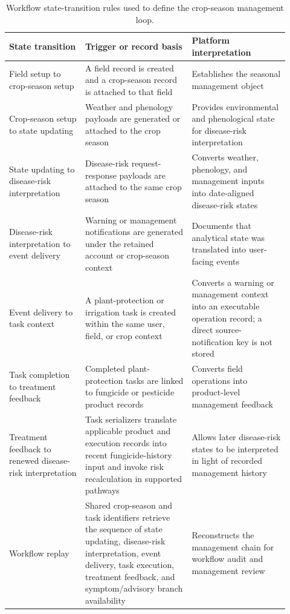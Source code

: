 \documentclass[12pt]{article}
\newcommand{\tablefontsize}{\fontsize{9pt}{11pt}\selectfont}
\begin{document}
\begin{table}[H]
\centering
\caption{Workflow state-transition rules used to define the crop-season management loop.}
\label{tab:state_transition_rules}
\tablefontsize
\begin{tabular}{@{}p{0.25\linewidth} p{0.35\linewidth} p{0.32\linewidth}@{}}
\toprule
State transition & Trigger or record basis & Platform interpretation \\
\midrule
Field setup to crop-season setup & A field record is created and a crop-season record is attached to that field & Establishes the seasonal management object \\
Crop-season setup to state updating & Weather and phenology payloads are generated or attached to the crop season & Provides environmental and phenological state for disease-risk interpretation \\
State updating to disease-risk interpretation & Disease-risk request-response payloads are attached to the same crop season & Converts weather, phenology, and management inputs into date-aligned disease-risk states \\
Disease-risk interpretation to event delivery & Warning or management notifications are generated under the retained account or crop-season context & Documents that analytical state was translated into user-facing events \\
Event delivery to task context & A plant-protection or irrigation task is created within the same user, field, or crop context & Converts a warning or management context into an executable operation record; a direct source-notification key is not stored \\
Task completion to treatment feedback & Completed plant-protection tasks are linked to fungicide or pesticide product records & Converts field operations into product-level management feedback \\
Treatment feedback to renewed disease-risk interpretation & Task serializers translate applicable product and execution records into recent fungicide-history input and invoke risk recalculation in supported pathways & Allows later disease-risk states to be interpreted in light of recorded management history \\
Workflow replay & Shared crop-season and task identifiers retrieve the sequence of state updating, disease-risk interpretation, event delivery, task execution, treatment feedback, and symptom/advisory branch availability & Reconstructs the management chain for workflow audit and management review \\
\bottomrule
\end{tabular}
\end{table}
\end{document}

